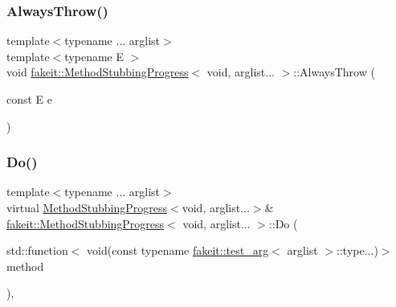 \mbox{\label{structfakeit_1_1MethodStubbingProgress_3_01void_00_01arglist_8_8_8_01_4_ad42a19c184f5efba2f997b30f57b9a24}} 
\subsubsection{\texorpdfstring{AlwaysThrow()}{AlwaysThrow()}\hspace{0.1cm}{\footnotesize\ttfamily [9/9]}}
{\footnotesize\ttfamily template$<$typename ... arglist$>$ \\
template$<$typename E $>$ \\
void \mbox{\hyperlink{structfakeit_1_1MethodStubbingProgress}{fakeit\+::\+Method\+Stubbing\+Progress}}$<$ void, arglist... $>$\+::Always\+Throw (\begin{DoxyParamCaption}\item[{const E}]{e }\end{DoxyParamCaption})\hspace{0.3cm}{\ttfamily [inline]}}

\mbox{\label{structfakeit_1_1MethodStubbingProgress_3_01void_00_01arglist_8_8_8_01_4_ae41031c8833fad09c16cbbc89569918b}} 
\subsubsection{\texorpdfstring{Do()}{Do()}\hspace{0.1cm}{\footnotesize\ttfamily [1/27]}}
{\footnotesize\ttfamily template$<$typename ... arglist$>$ \\
virtual \mbox{\hyperlink{structfakeit_1_1MethodStubbingProgress}{Method\+Stubbing\+Progress}}$<$void, arglist...$>$\& \mbox{\hyperlink{structfakeit_1_1MethodStubbingProgress}{fakeit\+::\+Method\+Stubbing\+Progress}}$<$ void, arglist... $>$\+::Do (\begin{DoxyParamCaption}\item[{std\+::function$<$ void(const typename \mbox{\hyperlink{structfakeit_1_1test__arg}{fakeit\+::test\+\_\+arg}}$<$ arglist $>$\+::type...)$>$}]{method }\end{DoxyParamCaption})\hspace{0.3cm}{\ttfamily [inline]}, {\ttfamily [virtual]}}


